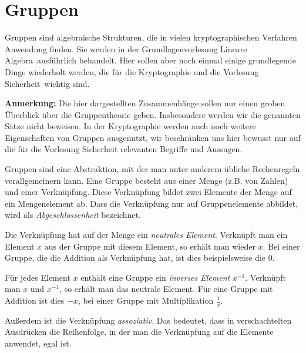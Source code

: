 \chapter{Gruppen}
Gruppen sind algebraische Strukturen, die in vielen kryptographischen
Verfahren Anwendung finden. Sie werden in der Grundlagenvorlesung
\glqq Lineare Algebra\grqq~ausführlich behandelt. Hier sollen aber noch einmal
einige grundlegende Dinge wiederholt werden, die für die Kryptographie
und die Vorlesung \glqq Sicherheit\grqq~wichtig sind. 

\textbf{Anmerkung:} Die hier dargestellten Zusammenhänge sollen nur
einen groben Überblick über die Gruppentheorie geben. Insbesondere
werden wir die genannten Sätze nicht beweisen. In der Kryptographie
werden auch noch weitere Eigenschaften von Gruppen ausgenutzt, wir
beschränken uns hier bewusst nur auf die für die Vorlesung \glqq Sicherheit\grqq{}
relevanten Begriffe und Aussagen.

Gruppen sind eine Abstraktion, mit der man unter anderem übliche
Rechenregeln verallgemeinern kann. Eine Gruppe besteht aus einer Menge
(z.B. von Zahlen) und einer Verknüpfung. Diese Verknüpfung bildet zwei
Elemente der Menge auf ein Mengenelement ab. Dass die Verknüpfung nur
auf Gruppenelemente abbildet, wird als \emph{Abgeschlossenheit}
bezeichnet.

Die Verknüpfung hat auf der Menge ein \emph{neutrales
  Element}. Verknüpft man ein Element $x$ aus der Gruppe mit diesem
Element, so erhält man wieder $x$. Bei einer Gruppe, die die Addition
als Verknüpfung hat, ist dies beispielsweise die $0$.

Für jedes Element $x$ enthält eine Gruppe ein \emph{inverses Element}
$x^{-1}$. Verknüpft man $x$ und $x^{-1}$, so erhält man das neutrale
Element. Für eine Gruppe mit Addition ist dies $-x$, bei einer Gruppe
mit Multiplikation $\frac{1}{x}$.

Außerdem ist die Verknüpfung \emph{assoziativ}. Das bedeutet, dass in
verschachtelten Ausdrücken die Reihenfolge, in der man die Verknüpfung
auf die Elemente anwendet, egal ist.

